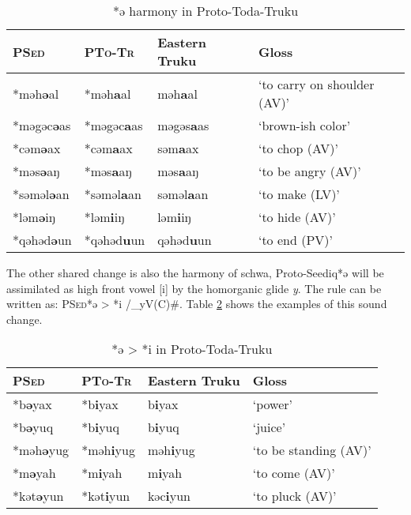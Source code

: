 \documentclass[12pt]{article}
\newcommand{\psed}{\textsc{PSed}\xspace}
\newcommand{\psedf}{Proto-Seediq\xspace}
\newcommand{\ptotr}{\textsc{PTo-Tr}\xspace}
\newcommand{\ptotrf}{Proto-Toda-Truku\xspace}
\newcommand{\setrf}{Eastern Truku\xspace}
\begin{document}
\begin{table}[!htbp]
\centering
\caption{*ə harmony in \ptotrf}
\label{tab:totrsc1}
\begin{tabular}{llll}
\hline
\psed     & \ptotr    & \setrf   & Gloss                       \\ \hline
*məh\textbf{ə}al   & *məh\textbf{a}al   & məh\textbf{a}al   & `to carry on shoulder (AV)' \\
*məgəc\textbf{ə}as & *məgəc\textbf{a}as & məgəs\textbf{a}as & `brown-ish color'           \\
*cəm\textbf{ə}ax   & *cəm\textbf{a}ax   & səm\textbf{a}ax   & `to chop (AV)'              \\
*məs\textbf{ə}aŋ   & *məs\textbf{a}aŋ   & məs\textbf{a}aŋ   & `to be angry (AV)'          \\
*səməl\textbf{ə}an & *səməl\textbf{a}an & səməl\textbf{a}an & `to make (LV)'              \\
*ləm\textbf{ə}iŋ   & *ləm\textbf{i}iŋ   & ləm\textbf{i}iŋ   & `to hide (AV)'              \\
*qəhəd\textbf{ə}un & *qəhəd\textbf{u}un & qəhəd\textbf{u}un & `to end (PV)'               \\ \hline
\end{tabular}
\end{table}

The other shared change is also the harmony of schwa, \psedf *ə will be assimilated as high front vowel [i] by the homorganic glide \textit{y}. The rule can be written as: \psed *ə > *i /\_yV(C)\#. Table \ref{tab:totrsc2} shows the examples of this sound change. 

\begin{table}[!htbp]
\centering
\caption{*ə > *i in \ptotrf}
\label{tab:totrsc2}
\begin{tabular}{llll}
\hline
\psed    & \ptotr   & \setrf  & Gloss                 \\ \hline
*b\textbf{ə}yax   & *b\textbf{i}yax   & b\textbf{i}yax   & `power'               \\
*b\textbf{ə}yuq   & *b\textbf{i}yuq   & b\textbf{i}yuq   & `juice'               \\
*məh\textbf{ə}yug & *məh\textbf{i}yug & məh\textbf{i}yug & `to be standing (AV)' \\
*m\textbf{ə}yah   & *m\textbf{i}yah   & m\textbf{i}yah   & `to come (AV)'        \\
*kət\textbf{ə}yun & *kət\textbf{i}yun & kəc\textbf{i}yun & `to pluck (AV)'       \\ \hline
\end{tabular}
\end{table}
\end{document}
